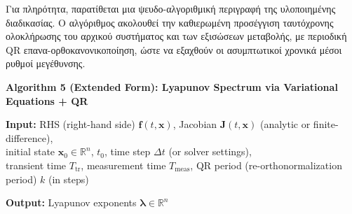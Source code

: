 \documentclass[11pt,a4paper]{report}
\begin{document}
Για πληρότητα, παρατίθεται μια ψευδο-αλγοριθμική περιγραφή της υλοποιημένης
διαδικασίας. Ο αλγόριθμος ακολουθεί την καθιερωμένη προσέγγιση ταυτόχρονης
ολοκλήρωσης του αρχικού συστήματος και των εξισώσεων μεταβολής, με περιοδική QR
επανα-ορθοκανονικοποίηση, ώστε να εξαχθούν οι ασυμπτωτικοί χρονικά μέσοι ρυθμοί μεγέθυνσης.

\begin{center}
\begin{tcolorbox}[appendixalgobox,width=0.95\linewidth]
\textbf{Algorithm 5 (Extended Form): Lyapunov Spectrum via Variational Equations + QR}

\vspace{0.5em}
\textbf{Input:} RHS (right-hand side) $\mathbf{f}(t,\mathbf{x})$, Jacobian $\mathbf{J}(t,\mathbf{x})$ (analytic or finite-difference),\\
initial state $\mathbf{x}_0 \in \mathbb{R}^n$, $t_0$, time step $\Delta t$ (or solver settings),\\
transient time $T_{\mathrm{tr}}$, measurement time $T_{\mathrm{meas}}$, QR period (re-orthonormalization period) $k$ (in steps)

\textbf{Output:} Lyapunov exponents $\boldsymbol{\lambda} \in \mathbb{R}^n$


\end{tcolorbox}
\end{center}
\end{document}
